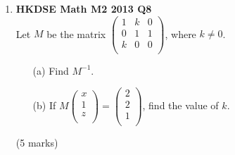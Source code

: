 \documentclass{report}
\begin{document}
\begin{enumerate}
	\item \textbf{HKDSE Math M2 2013 Q8}\\
	Let $M$ be the matrix $\begin{pmatrix}
		1 & k & 0\\
		0 & 1 & 1\\
		k & 0 & 0\\
	\end{pmatrix}$, where $k \neq 0$. 
	\begin{enumerate}
		\item [(a)]Find $M^{-1}$. 
		\item [(b)]If $M\begin{pmatrix}
		x\\
		1\\
		z\\
	\end{pmatrix} = \begin{pmatrix}
		2\\
		2\\
		1\\
	\end{pmatrix}$, find the value of $k$.
	\end{enumerate}
	(5 marks)

	\newpage


\end{enumerate}
\end{document}
